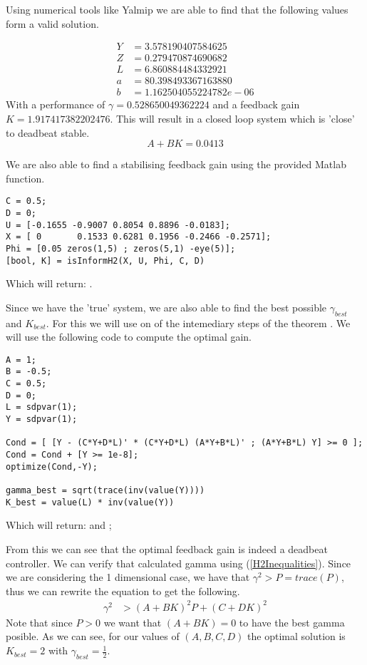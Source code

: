 Using numerical tools like Yalmip we are able to find that the following values form a valid solution.

\begin{align*}
	Y &= 3.578190407584625 \\
	Z &= 0.279470874690682 \\
	L &= 6.860884484332921 \\
	a &= 80.398493367163880 \\
	b &= 1.162504055224782e-06
\end{align*}
With a performance of $\gamma = 0.528650049362224$ and a feedback gain $K = 1.917417382202476$. This will result in a closed loop system which is 'close' to deadbeat stable.
\begin{equation*}
	A + BK = 0.0413
\end{equation*}

We are also able to find a stabilising feedback gain using the provided Matlab function.
\begin{lstlisting}
C = 0.5;
D = 0;
U = [-0.1655 -0.9007 0.8054 0.8896 -0.0183];
X = [ 0       0.1533 0.6281 0.1956 -0.2466 -0.2571];
Phi = [0.05 zeros(1,5) ; zeros(5,1) -eye(5)];
[bool, K] = isInformH2(X, U, Phi, C, D)
\end{lstlisting}
Which will return: \mon{[ 1, 1.917417382202475 ]}.

Since we have the 'true' system, we are also able to find the best possible $\gamma_{best}$ and $K_{best}$. For this we will use on of the intemediary steps of the theorem \cite[Equation 36]{waarde2020noisy}. We will use the following code to compute the optimal gain.
\begin{lstlisting}
A = 1;
B = -0.5;
C = 0.5;
D = 0;
L = sdpvar(1);
Y = sdpvar(1);

Cond = [ [Y - (C*Y+D*L)' * (C*Y+D*L) (A*Y+B*L)' ; (A*Y+B*L) Y] >= 0 ];
Cond = Cond + [Y >= 1e-8];
optimize(Cond,-Y);

gamma_best = sqrt(trace(inv(value(Y))))
K_best = value(L) * inv(value(Y))
\end{lstlisting}
Which will return:  and ;

From this we can see that the optimal feedback gain is indeed a deadbeat controller. We can verify that calculated gamma using (\ref{H2Inequalities}). Since we are considering the 1 dimensional case, we have that $\gamma^2 > P = trace(P)$, thus we can rewrite the equation to get the following. 
\begin{align*}
	\gamma^2 &> (A + BK)^2 P + (C+DK)^2 
\end{align*}
Note that since $P>0$ we want that $(A+BK) = 0$ to have the best gamma posible. As we can see, for our values of $(A,B,C,D)$ the optimal solution is $K_{best} = 2$ with $\gamma_{best} = \frac{1}{2}$.